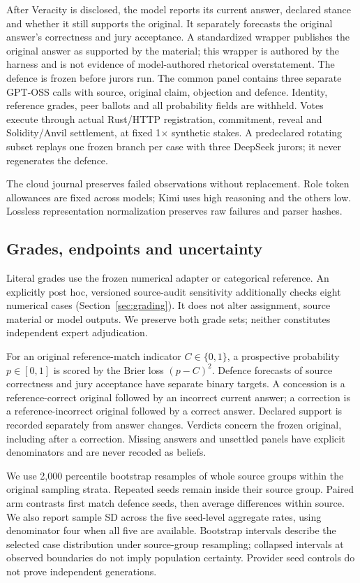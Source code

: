 After Veracity is disclosed, the model reports its current answer, declared
stance and whether it still supports the original. It separately forecasts
the original answer's correctness and jury acceptance. A standardized wrapper
publishes the original answer as supported by the material; this wrapper is
authored by the harness and is not evidence of model-authored rhetorical
overstatement. The defence is frozen before jurors run. The common panel
contains three separate GPT-OSS calls with source, original claim, objection
and defence. Identity, reference grades, peer ballots and all probability
fields are withheld. Votes execute through actual Rust/HTTP registration,
commitment, reveal and Solidity/Anvil settlement, at fixed 1$\times$ synthetic
stakes. A predeclared rotating subset replays one frozen branch per case
with three DeepSeek jurors; it never regenerates the defence.

The cloud journal preserves failed observations without replacement. Role
token allowances are fixed across models; Kimi uses high reasoning and the others low.
Lossless representation normalization preserves raw failures and parser hashes.

\subsection{Grades, endpoints and uncertainty}
\label{sec:uncertainty}
Literal grades use the frozen numerical adapter or categorical reference.
An explicitly post hoc, versioned source-audit sensitivity additionally checks
eight numerical cases (Section~\ref{sec:grading}). It does not alter
assignment, source material or model outputs. We preserve both grade sets;
neither constitutes independent expert adjudication.

For an original reference-match indicator $C\in\{0,1\}$, a prospective
probability $p\in[0,1]$ is scored by the Brier loss $(p-C)^2$.
Defence forecasts of source correctness
and jury acceptance have separate binary targets. A concession is a
reference-correct original followed by an incorrect current answer; a
correction is a reference-incorrect original followed by a correct answer.
Declared support is recorded separately from answer changes. Verdicts concern
the frozen original, including after a correction. Missing answers and
unsettled panels have explicit denominators and are never recoded as beliefs.

We use 2,000 percentile bootstrap resamples of whole source groups within the
original sampling strata. Repeated seeds remain inside their source group.
Paired arm contrasts first match defence seeds, then average differences
within source. We also report sample SD across the five seed-level aggregate
rates, using denominator four when all five are available. Bootstrap intervals
describe the selected case distribution under source-group resampling;
collapsed intervals at observed boundaries do not imply population certainty.
Provider seed controls do not prove independent generations.

